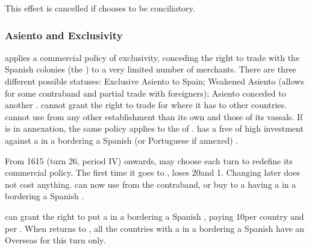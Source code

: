 
\bparag This effect is cancelled if \SPA chooses to be conciliatory.


\subsubsection{Asiento and Exclusivity}\label{chSpecific:Spain:Asiento}
\aparag \SPA applies a commercial policy of exclusivity, conceding the
right to trade with the Spanish colonies (the ) to a very
limited number of merchants. There are three different possible
statuses:
\bparag Exclusive Asiento to Spain;
\bparag Weakened Asiento (allows for some contraband and partial trade
with foreigners);
\bparag Asiento conceded to another \MAJ.
\bparag \SPA cannot grant the right to trade for \STZ where it has \COL
to other countries.
\bparag \SPA cannot use  from any other establishment than
its own and those of its vassals.
\bparag If  is in annexation, the same policy applies to
the \COL of .
\bparag \SPA has a free \CONC of high investment against a \TradeFLEET
in a \STZ bordering a Spanish (or Portuguese if annexed) \COL.

\bparag From 1615 (turn 26, period IV) onwards, \SPA may choose each
turn to redefine its commercial policy. The first time it goes to
, \SPA loses 20\VP and 1\STAB. Changing later
does not cost anything.
\bparag \SPA can now use  from the contraband, or buy
 to a \MAJ having a \TradeFLEET in a \STZ bordering a
Spanish \COL.

\bparag \SPA can grant the right to put a \TradeFLEET in a \STZ
bordering a Spanish \COL, paying 10\VP per country and per \STZ.
\bparag When \SPA returns to , all the
countries with a \TradeFLEET in a \STZ bordering a Spanish \COL have an
Overseas \CB for this turn only.

